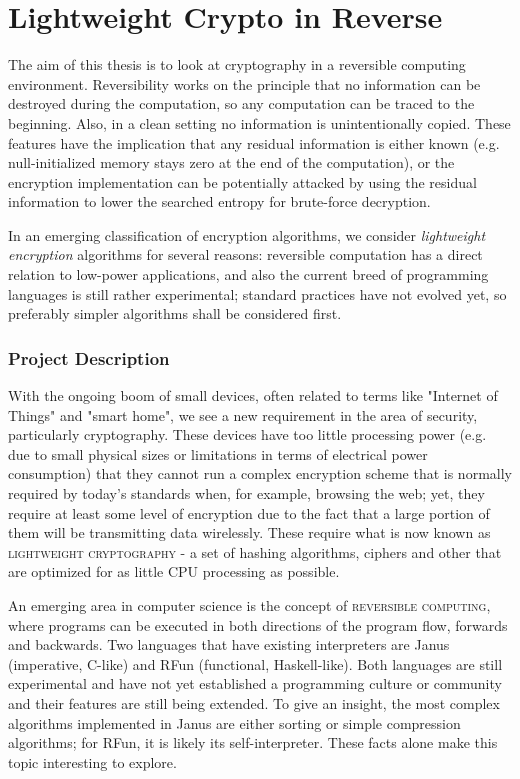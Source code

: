 \documentclass[a4paper]{article}
\renewenvironment{abstract}
 {\small
  \begin{center}
  \bfseries \abstractname\vspace{-.5em}\vspace{0pt}
  \end{center}
  \list{}{
    \setlength{\leftmargin}{.5cm}%
    \setlength{\rightmargin}{\leftmargin}%
  }%
  \item\relax}
 {\endlist}
\begin{document}
{
\part*{\center Lightweight Crypto in Reverse}
}

\begin{abstract} The aim of this thesis is to look at cryptography in a 
reversible computing environment. Reversibility works on the principle 
that no information can be destroyed during the computation, so any 
computation can be traced to the beginning. Also, in a clean setting no 
information is unintentionally copied. These features have the 
implication that any residual information is either known (e.g. 
null-initialized memory stays zero at the end of the computation), or 
the encryption implementation can be potentially attacked by using the 
residual information to lower the searched entropy for brute-force 
decryption.

In an emerging classification of encryption algorithms, we 
consider \textit{lightweight encryption} algorithms for several 
reasons: reversible computation has a direct relation to low-power 
applications, and also the current breed of programming languages is 
still rather experimental; standard practices have not evolved yet, so 
preferably simpler algorithms shall be considered first.
\end{abstract}


\section*{Project Description}

With the ongoing boom of small devices, often related to terms like 
"Internet of Things" and "smart home", we see a new requirement in the 
area of security, particularly cryptography. These devices have too 
little processing power (e.g. due to small physical sizes or 
limitations in terms of electrical power consumption) that they cannot 
run a complex encryption scheme that is normally required by today's 
standards when, for example, browsing the web; yet, they require at 
least some level of encryption due to the fact that a large portion of 
them will be transmitting data wirelessly. These require what is now 
known as \textsc{lightweight cryptography} - a set of hashing 
algorithms, ciphers and other that are optimized for as little CPU 
processing as possible.

An emerging area in computer science is the concept of 
\textsc{reversible computing}, where programs can be executed in both 
directions of the program flow, forwards and backwards. Two languages 
that have existing interpreters are Janus (imperative, C-like) and RFun 
(functional, Haskell-like). Both languages are still experimental and 
have not yet established a programming culture or community and their 
features are still being extended. To give an insight, the most complex 
algorithms implemented in Janus are either sorting or simple 
compression algorithms; for RFun, it is likely its self-interpreter. 
These facts alone make this topic interesting to explore.
\end{document}
